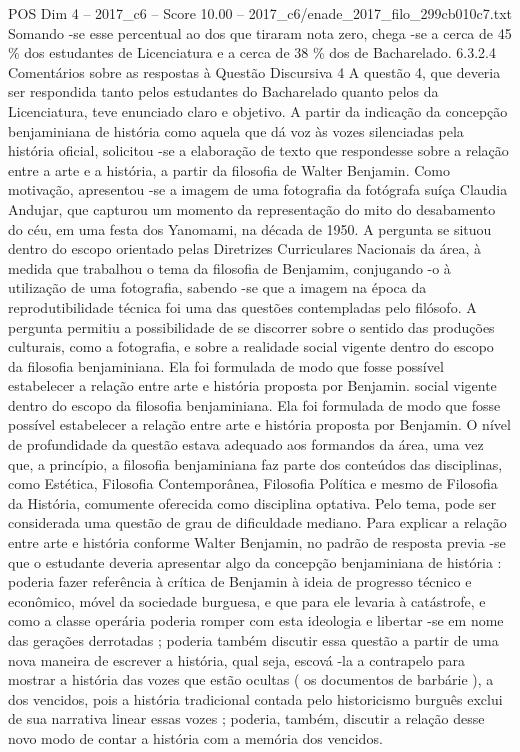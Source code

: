 \begin{textsample}{POS Dim 4 – 2017\_c6 – Score 10.00 – 2017\_c6/enade\_2017\_filo\_299cb010c7.txt}
Somando -se esse percentual ao dos que tiraram nota zero, chega -se a cerca de 45 \% dos estudantes de Licenciatura e a cerca de 38 \% dos de Bacharelado. 6.3.2.4 Comentários sobre as respostas à Questão Discursiva 4 A questão 4, que deveria ser respondida tanto pelos estudantes do Bacharelado quanto pelos da Licenciatura, teve enunciado claro e objetivo.
A partir da indicação da concepção benjaminiana de história como aquela que dá voz às vozes silenciadas pela história oficial, solicitou -se a elaboração de texto que respondesse sobre a relação entre a arte e a história, a partir da filosofia de Walter Benjamin.
Como motivação, apresentou -se a imagem de uma fotografia da fotógrafa suíça Claudia Andujar, que capturou um momento da representação do mito do desabamento do céu, em uma festa dos Yanomami, na década de 1950.
A pergunta se situou dentro do escopo orientado pelas Diretrizes Curriculares Nacionais da área, à medida que trabalhou o tema da filosofia de Benjamim, conjugando -o à utilização de uma fotografia, sabendo -se que a imagem na época da reprodutibilidade técnica foi uma das questões contempladas pelo filósofo.
A pergunta permitiu a possibilidade de se discorrer sobre o sentido das produções culturais, como a fotografia, e sobre a realidade social vigente dentro do escopo da filosofia benjaminiana.
Ela foi formulada de modo que fosse possível estabelecer a relação entre arte e história proposta por Benjamin. social vigente dentro do escopo da filosofia benjaminiana.
Ela foi formulada de modo que fosse possível estabelecer a relação entre arte e história proposta por Benjamin.
O nível de profundidade da questão estava adequado aos formandos da área, uma vez que, a princípio, a filosofia benjaminiana faz parte dos conteúdos das disciplinas, como Estética, Filosofia Contemporânea, Filosofia Política e mesmo de Filosofia da História, comumente oferecida como disciplina optativa.
Pelo tema, pode ser considerada uma questão de grau de dificuldade mediano.
Para explicar a relação entre arte e história conforme Walter Benjamin, no padrão de resposta previa -se que o estudante deveria apresentar algo da concepção benjaminiana de história : poderia fazer referência à crítica de Benjamin à ideia de progresso técnico e econômico, móvel da sociedade burguesa, e que para ele levaria à catástrofe, e como a classe operária poderia romper com esta ideologia e libertar -se em nome das gerações derrotadas ; poderia também discutir essa questão a partir de uma nova maneira de escrever a história, qual seja, escová -la a contrapelo para mostrar a história das vozes que estão ocultas ( os documentos de barbárie ), a dos vencidos, pois a história tradicional contada pelo historicismo burguês exclui de sua narrativa linear essas vozes ; poderia, também, discutir a relação desse novo modo de contar a história com a memória dos vencidos.

\end{textsample}

